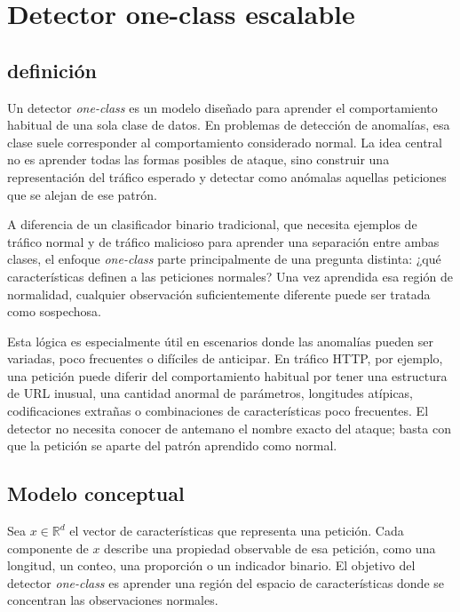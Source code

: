 \documentclass[12pt,oneside]{report}
\newcommand{\R}{\mathbb{R}}
\begin{document}
\section{Detector one-class escalable}

\subsection{definición}

Un detector \textit{one-class} es un modelo diseñado para aprender el comportamiento habitual de una sola clase de datos. En problemas de detección de anomalías, esa clase suele corresponder al comportamiento considerado normal. La idea central no es aprender todas las formas posibles de ataque, sino construir una representación del tráfico esperado y detectar como anómalas aquellas peticiones que se alejan de ese patrón.

A diferencia de un clasificador binario tradicional, que necesita ejemplos de tráfico normal y de tráfico malicioso para aprender una separación entre ambas clases, el enfoque \textit{one-class} parte principalmente de una pregunta distinta: ¿qué características definen a las peticiones normales? Una vez aprendida esa región de normalidad, cualquier observación suficientemente diferente puede ser tratada como sospechosa.

Esta lógica es especialmente útil en escenarios donde las anomalías pueden ser variadas, poco frecuentes o difíciles de anticipar. En tráfico HTTP, por ejemplo, una petición puede diferir del comportamiento habitual por tener una estructura de URL inusual, una cantidad anormal de parámetros, longitudes atípicas, codificaciones extrañas o combinaciones de características poco frecuentes. El detector no necesita conocer de antemano el nombre exacto del ataque; basta con que la petición se aparte del patrón aprendido como normal.

\subsection{Modelo conceptual}

Sea $x \in \R^d$ el vector de características que representa una petición. Cada componente de $x$ describe una propiedad observable de esa petición, como una longitud, un conteo, una proporción o un indicador binario. El objetivo del detector \textit{one-class} es aprender una región del espacio de características donde se concentran las observaciones normales.
\end{document}
